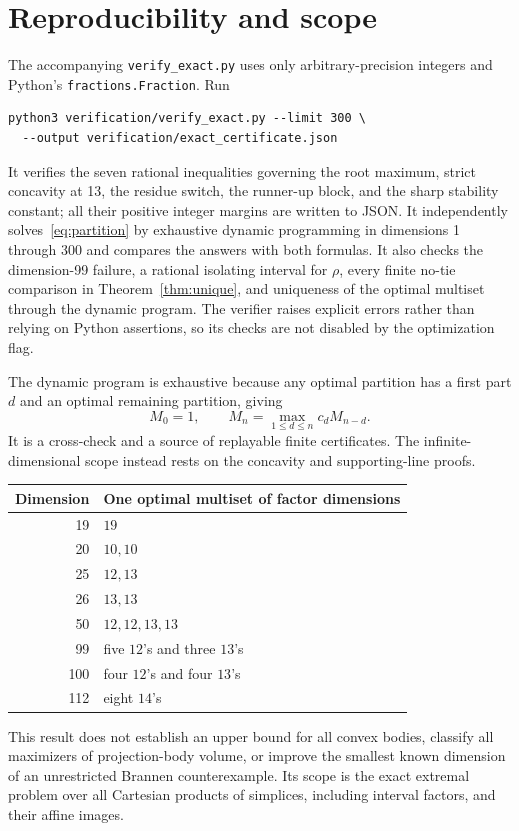 \documentclass[11pt]{article}
\theoremstyle{remark}\newtheorem{remark}[theorem]{Remark}
\begin{document}
\section{Reproducibility and scope}
The accompanying \texttt{verify\_exact.py} uses only arbitrary-precision integers and Python's \texttt{fractions.Fraction}. Run
\begin{verbatim}
python3 verification/verify_exact.py --limit 300 \
  --output verification/exact_certificate.json
\end{verbatim}
It verifies the seven rational inequalities governing the root maximum, strict concavity at 13, the residue switch, the runner-up block, and the sharp stability constant; all their positive integer margins are written to JSON. It independently solves~\eqref{eq:partition} by exhaustive dynamic programming in dimensions 1 through 300 and compares the answers with both formulas. It also checks the dimension-99 failure, a rational isolating interval for $\rho$, every finite no-tie comparison in Theorem~\ref{thm:unique}, and uniqueness of the optimal multiset through the dynamic program. The verifier raises explicit errors rather than relying on Python assertions, so its checks are not disabled by the optimization flag.

The dynamic program is exhaustive because any optimal partition has a first part $d$ and an optimal remaining partition, giving
\[
 M_0=1,\qquad M_n=\max_{1\le d\le n}c_dM_{n-d}.
\]
It is a cross-check and a source of replayable finite certificates. The infinite-dimensional scope instead rests on the concavity and supporting-line proofs.

\begin{center}
\begin{tabular}{r l}
\toprule
Dimension & One optimal multiset of factor dimensions\\
\midrule
19 & $19$\\
20 & $10,10$\\
25 & $12,13$\\
26 & $13,13$\\
50 & $12,12,13,13$\\
99 & five $12$'s and three $13$'s\\
100 & four $12$'s and four $13$'s\\
112 & eight $14$'s\\
\bottomrule
\end{tabular}
\end{center}

This result does not establish an upper bound for all convex bodies, classify all maximizers of projection-body volume, or improve the smallest known dimension of an unrestricted Brannen counterexample. Its scope is the exact extremal problem over all Cartesian products of simplices, including interval factors, and their affine images.
\end{document}
